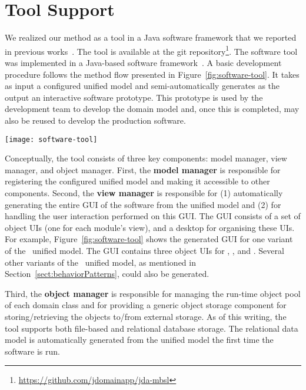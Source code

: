 \section{Tool Support}
\label{sect:tool} %
We realized our method as a tool in a Java software framework that we reported in previous works~\cite{le_domain_2018}. The tool is available at the git repository\footnote{\url{https://github.com/jdomainapp/jda-mbsl}}. The software tool was implemented in a Java-based software framework~\cite{le_jdomainapp_2017}. A basic development procedure follows the method flow presented in Figure~\ref{fig:software-tool}. It takes as input a configured unified model and semi-automatically generates as the output an interactive software prototype. This prototype is used by the development team to develop the domain model and, once this is completed, may also be reused to develop the production software.

\begin{figure*}[ht]
	\centering
	\texttt{[image: software-tool]}
	\caption{The GUI of \courseman~software generated by the tool: (1) desktop, 
		(2-4) the object UIs of , , and .} %
	\label{fig:software-tool}
\end{figure*}

Conceptually, the tool consists of three key components: model manager, view manager, and object manager. First, the \textbf{model manager} is responsible for registering the configured unified model and making it accessible to other components. 
Second, the \textbf{view manager} is responsible for (1) automatically generating the entire GUI of the software from the unified model and (2) for handling the user interaction performed on this GUI. The GUI consists of a set of object UIs (one for each module's view), and a desktop for organising these UIs. For example, Figure~\ref{fig:software-tool} shows the generated GUI for one variant of the \courseman~unified model. The GUI contains three object UIs for , , and .
Several other variants of the \courseman~unified model, as mentioned in Section~\ref{sect:behaviorPatterns}, could also be generated. 

Third, the \textbf{object manager} is responsible for managing the run-time object pool of each domain class and for providing a generic object storage component for storing/retrieving the objects to/from external storage. As of this writing, the tool supports both file-based and relational database storage. The relational data model is automatically generated from the unified model the first time the software is run.